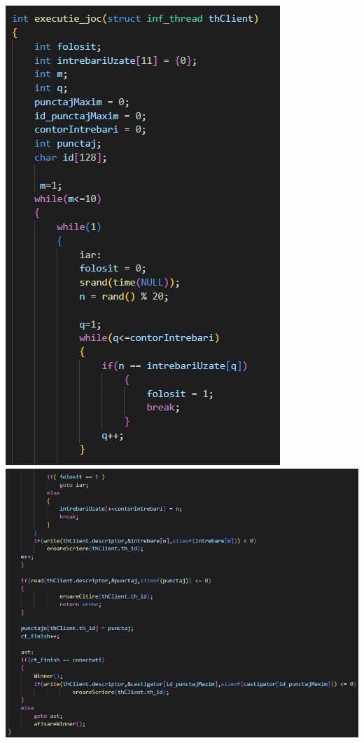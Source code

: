 \documentclass{article}
\begin{document}
\vspace{0.3cm}

\includegraphics[scale=0.5]{server4}
\includegraphics[scale=0.5]{server5}
\end{document}
